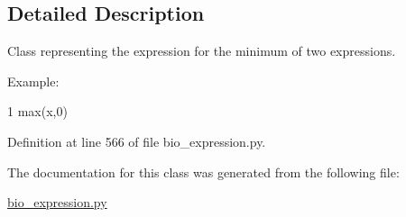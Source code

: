 \subsection{Detailed Description}
Class representing the expression for the minimum of two expressions. 

Example\+: 
\begin{DoxyCode}
1 max(x,0)
\end{DoxyCode}
 

Definition at line 566 of file bio\+\_\+expression.\+py.



The documentation for this class was generated from the following file\+:\begin{DoxyCompactItemize}
\item 
\hyperlink{bio__expression_8py}{bio\+\_\+expression.\+py}\end{DoxyCompactItemize}
